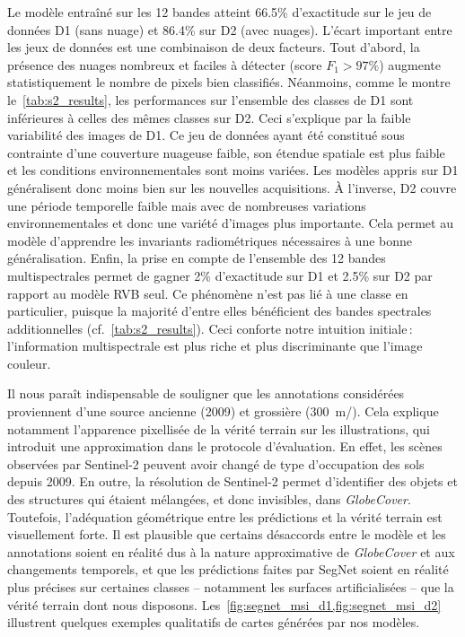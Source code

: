 Le modèle entraîné sur les 12 bandes atteint \num{66,5}\% d'exactitude sur le jeu de données D1 (sans nuage) et \num{86,4}\% sur D2 (avec nuages). L'écart important entre les jeux de données est une combinaison de deux facteurs. Tout d'abord, la présence des nuages nombreux et faciles à détecter (score $F_1 > 97\%$) augmente statistiquement le nombre de pixels bien classifiés. Néanmoins, comme le montre le~\cref{tab:s2_results}, les performances sur l'ensemble des classes de D1 sont inférieures à celles des mêmes classes sur D2. Ceci s'explique par la faible variabilité des images de D1. Ce jeu de données ayant été constitué sous contrainte d'une couverture nuageuse faible, son étendue spatiale est plus faible et les conditions environnementales sont moins variées. Les modèles appris sur D1 généralisent donc moins bien sur les nouvelles acquisitions. À l'inverse, D2 couvre une période temporelle faible mais avec de nombreuses variations environnementales et donc une variété d'images plus importante. Cela permet au modèle d'apprendre les invariants radiométriques nécessaires à une bonne généralisation.
Enfin, la prise en compte de l'ensemble des 12 bandes multispectrales permet de gagner 2\% d'exactitude sur D1 et \num{2,5}\% sur D2 par rapport au modèle \gls{RVB} seul. Ce phénomène n'est pas lié à une classe en particulier, puisque la majorité d'entre elles bénéficient des bandes spectrales additionnelles (cf.~\cref{tab:s2_results}). Ceci conforte notre intuition initiale\,: l'information multispectrale est plus riche et plus discriminante que l'image couleur.

Il nous paraît indispensable de souligner que les annotations considérées proviennent d'une source ancienne (2009) et grossière (\SI{300}{\meter/\px}). Cela explique notamment l'apparence pixellisée de la vérité terrain sur les illustrations, qui introduit une approximation dans le protocole d'évaluation. En effet, les scènes observées par Sentinel-2 peuvent avoir changé de type d'occupation des sols depuis 2009. En outre, la résolution de Sentinel-2 permet d'identifier des objets et des structures qui étaient mélangées, et donc invisibles, dans \emph{GlobeCover}. Toutefois, l'adéquation géométrique entre les prédictions et la vérité terrain est visuellement forte. Il est plausible que certains désaccords entre le modèle et les annotations soient en réalité dus à la nature approximative de \emph{GlobeCover} et aux changements temporels, et que les prédictions faites par SegNet soient en réalité plus précises sur certaines classes -- notamment les surfaces artificialisées -- que la vérité terrain dont nous disposons. Les~\cref{fig:segnet_msi_d1,fig:segnet_msi_d2} illustrent quelques exemples qualitatifs de cartes générées par nos modèles.

